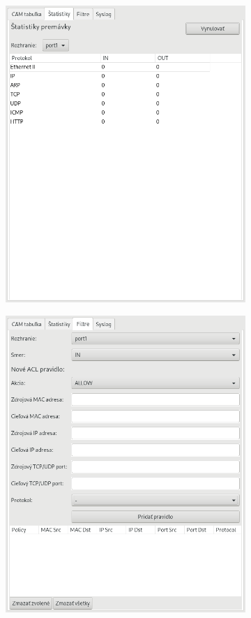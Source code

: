 \documentclass[12pt, a4paper]{article}
\begin{document}
\begin{figure}[h!]
\begin{subfigure}{0.45\textwidth}
	\includegraphics[width=\textwidth]{assets/stats.png}
\end{subfigure}
\hfill
\par\bigskip
\begin{subfigure}{0.45\textwidth}
	\centering
	\includegraphics[width=\textwidth]{assets/filters.png}

\end{subfigure}
\end{figure}
\end{document}
